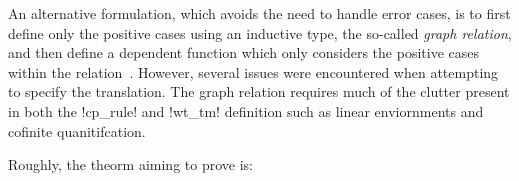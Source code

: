 An alternative formulation, which avoids the need to handle error cases, is to
first define only the positive cases using an inductive type, the so-called
\textit{graph relation}, and then define a dependent function which only
considers the positive cases within the relation~\cite{McKinna:2009}. However,
several issues were encountered when attempting to specify the
translation. The graph relation requires much of the clutter present in both
the \coqe!cp_rule! and \coqe!wt_tm! definition such as linear enviornments and
cofinite quanitifcation.
\begin{comment}
i'm not sure about that but what is can i say so for example lets see see no i
also have to thing about the general guidelines i can be giving for this
section so we have something to say about guidelines do we yes of course we
have can say that out of this we realised that it is important for a
representation to be good enough to succintly express that which we wish to
say in particular the graph relation the inductive type that we define
propositionally is better one would think than the other way the monadic
possible failure way is not producing a valid thing that we can inductively
induct on so we concern ourself with the proof of translation preserving the
typed term and i think it is important to remember the problem we had with the
inductive hypothesis we had something do with translating the inner term of a
weakening term in a larger context than the one we had available and that was
to do with the destruction of the term inference thing i think no no it was
something else we had the inner term and we had it well typed in an
environment that was smaller sure and then our thing our function was saying
we had some environment that typed both the inner term and the outer weakening
term but we know that is wrong so wrong so here is perhaps where the inductive
type graph relation thing wins out in that we can have a hypothesis for the
inner term which is sufficiently small for the environment and we pattern
match not only on the term but also on the environment yes that is we will do
because it seems to work only when we get to the messy two the messy two
constructor caases will this become a bigg problem inthat we will then have
all this stuff about environment being split and needing to be recombined in
the composite process that is a term not a process but the point still stands
it will need to be about the term and the splitting is really a duplication of
the unfortunately the well typed term relation but otherwise i cannot think
how to reuse or obtain that information for the translation to cp
\end{comment}
Roughly, the theorm aiming to prove is:

